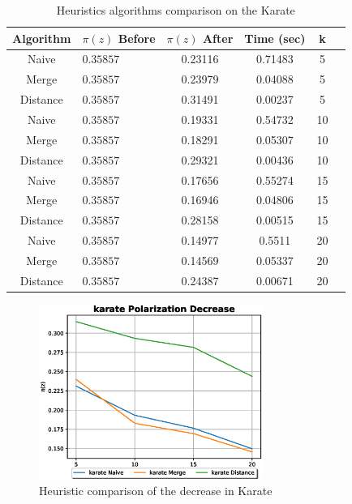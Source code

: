 \begin{table}[htbp]
 \centering
 \caption{Heuristics algorithms comparison on the Karate}
 \label{tab:heuristicsKarate}
 \begin{tabular}{|c |l| c | c | c | c ||}
 \hline
  Algorithm & $\pi(z)$ Before &  $\pi(z)$ After & Time (sec) & k\\
  \hline
  \hline
  Naive  & $0.35857$ & 0.23116 &  0.71483&5 \\
  \hline
  Merge & $0.35857$ & 0.23979 &  0.04088&5 \\
  \hline
  Distance &  $0.35857$ & 0.31491 &  0.00237 &5\\
  \hline
  \hline
  Naive &  $0.35857$ & 0.19331 &  0.54732 &10\\
  \hline
  Merge &  $0.35857$ & 0.18291 &  0.05307&10 \\
  \hline
  Distance &  $0.35857$ & 0.29321 &  0.00436&10\\
  \hline
  \hline
  Naive &  $0.35857$ & 0.17656 &  0.55274 &15\\
  \hline
  Merge &  $0.35857$ & 0.16946 &  0.04806&15\\
  \hline
  Distance &  $0.35857$ & 0.28158 &  0.00515&15\\
  \hline
  \hline
  Naive &  $0.35857$ & 0.14977 &  0.5511 &20\\
  \hline
  Merge &  $0.35857$ & 0.14569 &  0.05337&20\\
  \hline
  Distance &  $0.35857$ & 0.24387 &  0.00671&20\\
  \hline
 \end{tabular}
\end{table}

\begin{figure}[!htbp]
	\centering
	\includegraphics[width=0.65\textwidth]{Figures/karate_pol}
	\caption{Heuristic comparison of the decrease in Karate}
	\label{fig:karate_pol}
\end{figure}


